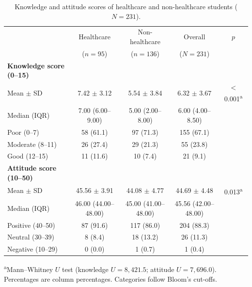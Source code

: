 \begin{table}[htbp]\centering\footnotesize\setlength{\tabcolsep}{4pt}
\caption{Knowledge and attitude scores of healthcare and non-healthcare students ($N=231$).}\label{tab:scores}
\begin{tabularx}{\textwidth}{@{}>{\raggedright\arraybackslash}X cccc@{}}\toprule
 & Healthcare & Non-healthcare & Overall & $p$ \\
 & ($n=95$) & ($n=136$) & ($N=231$) &  \\\midrule
\textbf{Knowledge score (0--15)} &&&& \\
\quad Mean $\pm$ SD & 7.42 $\pm$ 3.12 & 5.54 $\pm$ 3.84 & 6.32 $\pm$ 3.67 & $<$0.001\textsuperscript{a} \\
\quad Median (IQR) & 7.00 (6.00--9.00) & 5.00 (2.00--8.00) & 6.00 (4.00--8.50) & \\
\quad Poor (0--7) & 58 (61.1) & 97 (71.3) & 155 (67.1) & \\
\quad Moderate (8--11) & 26 (27.4) & 29 (21.3) & 55 (23.8) & \\
\quad Good (12--15) & 11 (11.6) & 10 (7.4) & 21 (9.1) & \\
\midrule
\textbf{Attitude score (10--50)} &&&& \\
\quad Mean $\pm$ SD & 45.56 $\pm$ 3.91 & 44.08 $\pm$ 4.77 & 44.69 $\pm$ 4.48 & 0.013\textsuperscript{a} \\
\quad Median (IQR) & 46.00 (44.00--48.00) & 45.00 (41.00--48.00) & 45.56 (42.00--48.00) & \\
\quad Positive (40--50) & 87 (91.6) & 117 (86.0) & 204 (88.3) & \\
\quad Neutral (30--39) & 8 (8.4) & 18 (13.2) & 26 (11.3) & \\
\quad Negative (10--29) & 0 (0.0) & 1 (0.7) & 1 (0.4) & \\
\bottomrule\end{tabularx}

\vspace{2pt}\raggedright\scriptsize \textsuperscript{a}Mann--Whitney $U$ test (knowledge $U=8,421.5$; attitude $U=7,696.0$). Percentages are column percentages. Categories follow Bloom's cut-offs.
\end{table}
